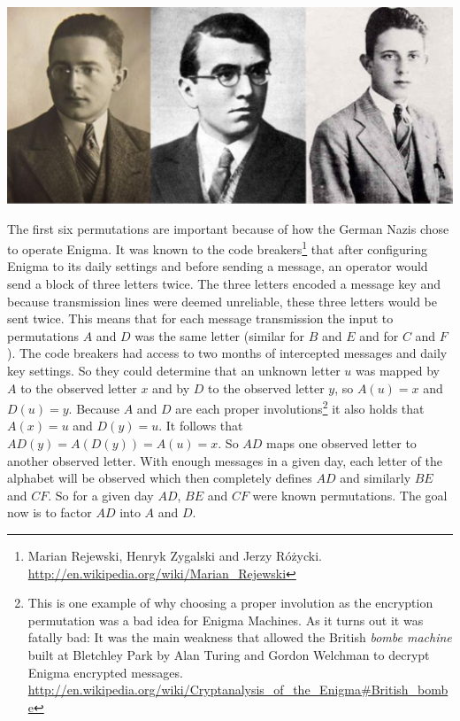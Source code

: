 \begin{marginfigure}[1.0in]
\includegraphics[scale=0.25]{attackers.pdf}
\end{marginfigure}

The first six permutations are important because of how the German Nazis chose to operate Enigma. It was known to the code breakers\footnote{Marian Rejewski, Henryk Zygalski and Jerzy Różycki. \url{http://en.wikipedia.org/wiki/Marian_Rejewski}} that after configuring Enigma to its daily settings and before sending a message, an operator would send a block of three letters twice. The three letters encoded a message key and because transmission lines were deemed unreliable, these three letters would be sent twice. This means that for each message transmission the input to permutations $A$ and $D$ was the same letter (similar for $B$ and $E$ and for $C$ and $F$). The code breakers had access to two months of intercepted messages and daily key settings. So they could determine that an unknown letter $u$ was mapped by $A$ to the observed letter $x$ and by $D$ to the observed letter $y$, so $A(u)=x$ and $D(u)=y$. Because $A$ and $D$ are each proper involutions\footnote{This is one example of why choosing a proper involution as the encryption permutation was a bad idea for Enigma Machines. As it turns out it was fatally bad: It was the main weakness that allowed the British \textit{bombe machine} built at Bletchley Park by Alan Turing and Gordon Welchman to decrypt Enigma encrypted messages. \url{http://en.wikipedia.org/wiki/Cryptanalysis_of_the_Enigma\#British_bombe}} it also holds that $A(x)=u$ and $D(y)=u$. It follows that $AD(y)=A(D(y))=A(u)=x$. So $AD$ maps one observed letter to another observed letter. With enough messages in a given day, each letter of the alphabet will be observed which then completely defines $AD$ and similarly $BE$ and $CF$. So for a given day $AD$, $BE$ and $CF$ were known permutations. The goal now is to factor $AD$ into $A$ and $D$. 

